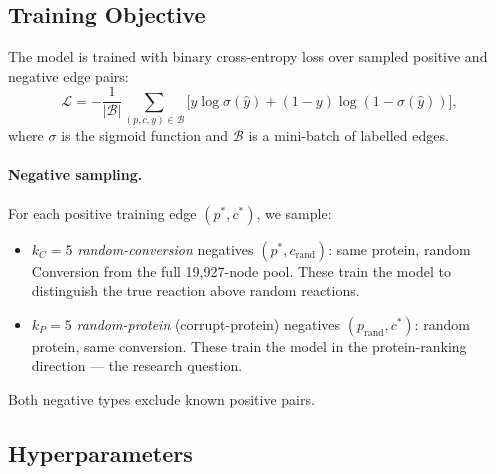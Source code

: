 \subsection{Training Objective}

The model is trained with binary cross-entropy loss over sampled positive and
negative edge pairs:
\begin{equation}
  \mathcal{L}
  = -\frac{1}{|\mathcal{B}|} \sum_{(p,c,y) \in \mathcal{B}}
    \bigl[y \log \sigma(\hat{y}) + (1-y)\log(1 - \sigma(\hat{y}))\bigr],
\end{equation}
where $\sigma$ is the sigmoid function and $\mathcal{B}$ is a mini-batch of
labelled edges.

\paragraph{Negative sampling.}
For each positive training edge $(p^*, c^*)$, we sample:
\begin{itemize}
  \item $k_C = 5$ \emph{random-conversion} negatives $(p^*, c_\text{rand})$:
    same protein, random Conversion from the full 19,927-node pool.
    These train the model to distinguish the true reaction above random reactions.
  \item $k_P = 5$ \emph{random-protein} (corrupt-protein) negatives
    $(p_\text{rand}, c^*)$: random protein, same conversion.
    These train the model in the protein-ranking direction — the research question.
\end{itemize}
Both negative types exclude known positive pairs.

\subsection{Hyperparameters}

